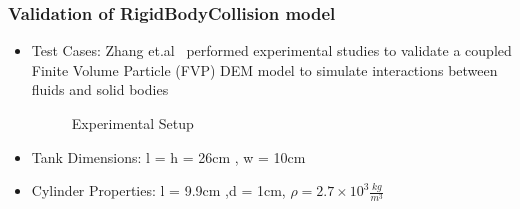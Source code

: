 \documentclass{beamer}
\begin{document}
  \begin{frame} %
  \frametitle{Validation of RigidBodyCollision model}
  	\begin{itemize}
  	 \item Test Cases: Zhang et.al\footnotemark ~ performed experimental studies to validate a coupled Finite Volume Particle (FVP) DEM model to simulate interactions between fluids and solid bodies 
 	   \begin{figure}
 	   \caption{Experimental Setup}
 	   \end{figure}
 	   \item Tank Dimensions: l = h = 26cm , w = 10cm
 	   \item Cylinder Properties: l = 9.9cm ,d = 1cm, $\rho =2.7 \times 10^{3} \frac{kg}{m^3} $
    \end{itemize}
    
  \end{frame}
  
\end{document}
